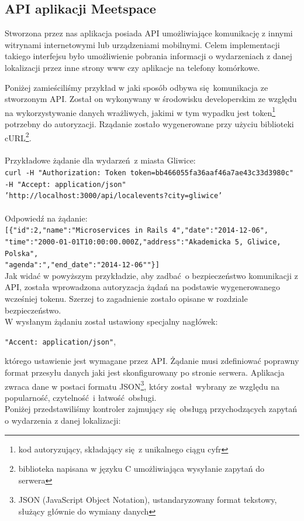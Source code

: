 \subsection{API aplikacji Meetspace}
  Stworzona przez nas aplikacja posiada API umożliwiające komunikację z innymi witrynami internetowymi lub urządzeniami mobilnymi. Celem implementacji takiego interfejsu było umożliwienie pobrania informacji o wydarzeniach z danej lokalizacji przez inne strony www czy aplikacje na telefony komórkowe.


  Poniżej zamieściliśmy przykład w jaki sposób odbywa się komunikacja ze stworzonym API. Został on wykonywany w środowisku developerskim ze względu na wykorzystywanie danych wrażliwych, jakimi w tym wypadku jest token\footnote{kod autoryzujący, składający się z unikalnego ciągu cyfr} potrzebny do autoryzacji. Rządanie zostało wygenerowane przy użyciu biblioteki cURL\footnote{biblioteka napisana w języku C umożliwiająca wysyłanie zapytań do serwera}.
  \\ \\
  Przykładowe żądanie dla wydarzeń z miasta Gliwice:\\
    \texttt{curl -H "Authorization: Token token=bb466055fa36aaf46a7ae43c33d3980c"
    -H "Accept: application/json"\\
    'http://localhost:3000/api/localevents?city=gliwice'}\\ \\
  Odpowiedź na żądanie:\\
    \texttt{[\{"id":2,"name":"Microservices in Rails 4","date":"2014-12-06",\\
    "time":"2000-01-01T10:00:00.000Z,"address":"Akademicka 5, Gliwice, Polska",\\
    "agenda":","end\_{}date":"2014-12-06""\}]}\\

  Jak widać w powyższym przykładzie, aby zadbać o bezpieczeństwo komunikacji z API, została wprowadzona autoryzacja żądań na podstawie wygenerowanego wcześniej tokenu. Szerzej to zagadnienie zostało opisane w rozdziale bezpieczeństwo.\\
  W wysłanym żądaniu został ustawiony specjalny nagłówek:
  \begin{center}
    \texttt{"Accent: application/json"},
  \end{center}
  którego ustawienie jest wymagane przez API. Żądanie musi zdefiniować poprawny format przesyłu danych jaki jest skonfigurowany po stronie serwera.
  Aplikacja zwraca dane w postaci formatu JSON\footnote{JSON (JavaScript Object Notation), ustandaryzowany format tekstowy, służący głównie do wymiany danych\cite{json}}, który został wybrany ze względu na popularność, czytelność i łatwość obsługi.\\
  Poniżej przedstawiliśmy kontroler zajmujący się obsługą przychodzących zapytań o wydarzenia z danej lokalizacji:\\

